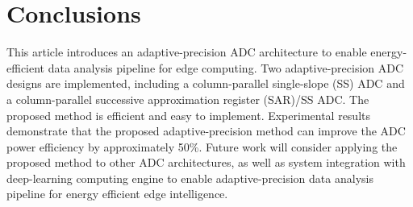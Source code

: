 \section{Conclusions}\label{conclusion}

This article introduces an adaptive-precision ADC architecture to enable energy-efficient 
data analysis pipeline for edge computing. Two adaptive-precision ADC designs are implemented, 
including a column-parallel single-slope (SS) ADC and a column-parallel successive approximation 
register (SAR)/SS ADC. The proposed method is efficient and easy to implement. Experimental results 
demonstrate that the proposed adaptive-precision method can improve the ADC power efficiency by 
approximately 50\%. Future work will consider applying the proposed method to other ADC architectures, 
as well as system integration with deep-learning computing engine to enable adaptive-precision
data analysis pipeline for energy efficient edge intelligence. 

